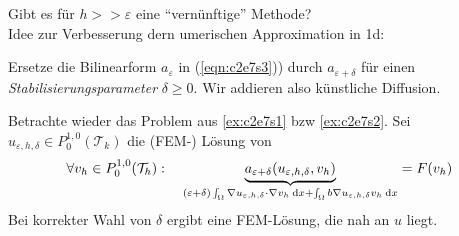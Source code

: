 \documentclass[../skript.tex]{subfiles}
\begin{document}
 Gibt es für $h>>\varepsilon$ eine ``vernünftige'' Methode?\\
 Idee zur Verbesserung dern umerischen Approximation in 1d:\par
 Ersetze die Bilinearform $a_\varepsilon$ in (\ref{eqn:c2e7s3})) durch $a_{\varepsilon+\delta}$ für einen \emph{Stabilisierungsparameter} $\delta \geq 0$. Wir addieren also künstliche Diffusion. 
 \begin{example}\label{ex:c2e7s3}
 	Betrachte wieder das Problem aus \cref{ex:c2e7s1} bzw \cref{ex:c2e7s2}. Sei $u_{\varepsilon,h,\delta}\in P^{1,0}_0(\mathcal{T}_k)$ die (FEM-) Lösung von
 	\[
 		\forall v_h\in P^{1,0}_0(\mathcal{T}_h):\quad \underbrace{a_{\varepsilon+\delta}(u_{\varepsilon,h,\delta}, v_h)}_{(\varepsilon+\delta)\int_\Omega\nabla u_{\varepsilon,h,\delta} \cdot\nabla v_h\:\mathrm{d}x + \int_\Omega b\nabla u_{\varepsilon,h,\delta}v_h\:\mathrm{d}x} = F(v_h)
 	\] 
 	Bei korrekter Wahl von $\delta$ ergibt eine FEM-Lösung, die nah an $u$ liegt.
 \end{example}
\end{document}
